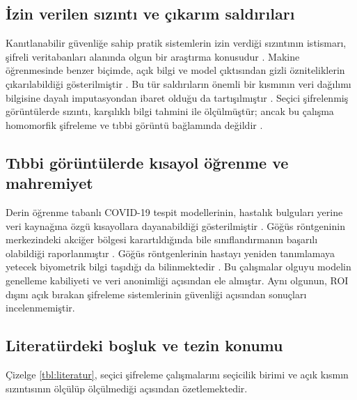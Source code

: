\subsection{İzin verilen sızıntı ve çıkarım saldırıları}\label{lit:leakage}

Kanıtlanabilir güvenliğe sahip pratik sistemlerin izin verdiği sızıntının istismarı, şifreli veritabanları alanında olgun bir araştırma konusudur \cite{naveed2015inference,cash2015leakage}. Makine öğrenmesinde benzer biçimde, açık bilgi ve model çıktısından gizli özniteliklerin çıkarılabildiği gösterilmiştir \cite{luo2021feature}. Bu tür saldırıların önemli bir kısmının veri dağılımı bilgisine dayalı imputasyondan ibaret olduğu da tartışılmıştır \cite{jayaraman2022imputation}. Seçici şifrelenmiş görüntülerde sızıntı, karşılıklı bilgi tahmini ile ölçülmüştür; ancak bu çalışma homomorfik şifreleme ve tıbbi görüntü bağlamında değildir \cite{messadi2025selective}.

\subsection{Tıbbi görüntülerde kısayol öğrenme ve mahremiyet}\label{lit:shortcut}

Derin öğrenme tabanlı COVID-19 tespit modellerinin, hastalık bulguları yerine veri kaynağına özgü kısayollara dayanabildiği gösterilmiştir \cite{degrave2021shortcuts}. Göğüs röntgeninin merkezindeki akciğer bölgesi karartıldığında bile sınıflandırmanın başarılı olabildiği raporlanmıştır \cite{maguolo2021critic}. Göğüs röntgenlerinin hastayı yeniden tanımlamaya yetecek biyometrik bilgi taşıdığı da bilinmektedir \cite{packhauser2022reid}. Bu çalışmalar olguyu modelin genelleme kabiliyeti ve veri anonimliği açısından ele almıştır. Aynı olgunun, ROI dışını açık bırakan şifreleme sistemlerinin güvenliği açısından sonuçları incelenmemiştir.

\subsection{Literatürdeki boşluk ve tezin konumu}\label{lit:gap}

Çizelge \ref{tbl:literatur}, seçici şifreleme çalışmalarını seçicilik birimi ve açık kısmın sızıntısının ölçülüp ölçülmediği açısından özetlemektedir.

